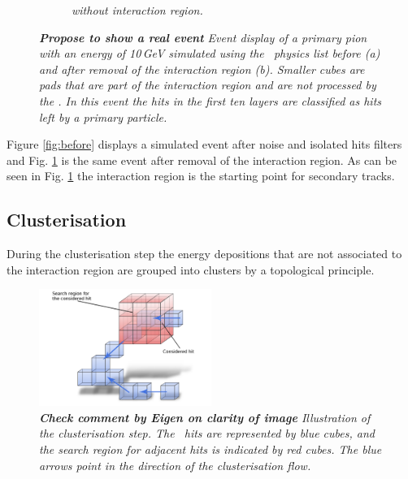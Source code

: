 \begin{figure}[H]
\begin{subfigure}{0.5\textwidth}
		\caption{\label{fig:after} \sl without interaction region.}
	\end{subfigure}
	\caption{ \sl {\bf Propose to show a real event} Event display of a primary pion with an energy of 10\,GeV simulated using the \ftfp\ physics list before \textit{(a)} and after removal of the interaction region \textit{(b)}. Smaller cubes are pads that are part of the interaction region and are not processed by the \tfa . In this event the hits in the first ten layers are classified as hits left by a primary particle.}
	
	\label{fig:test}
\end{figure}

Figure \ref{fig:before} displays a simulated event after noise and isolated hits filters and Fig. \ref{fig:after} is the same event after removal of the interaction region. As can be seen in Fig. \ref{fig:after} the interaction region is the starting point for secondary tracks.



\subsection{Clusterisation}\label{sec:cluster}
During the clusterisation step the energy depositions that are not associated to the interaction region are grouped into clusters by a topological principle. %

\begin{figure}[H]
	\centering
	\includegraphics[width=0.5\textwidth]{ECAL/graphics/demo-v2.png}
	\caption{\label{fig:democluster} \sl {\bf Check comment by Eigen on clarity of image} Illustration of the clusterisation step. The \ecal\ hits are represented by blue cubes, and the search region for adjacent hits is indicated by red cubes. The blue arrows point in the direction of the clusterisation flow. }
\end{figure}

